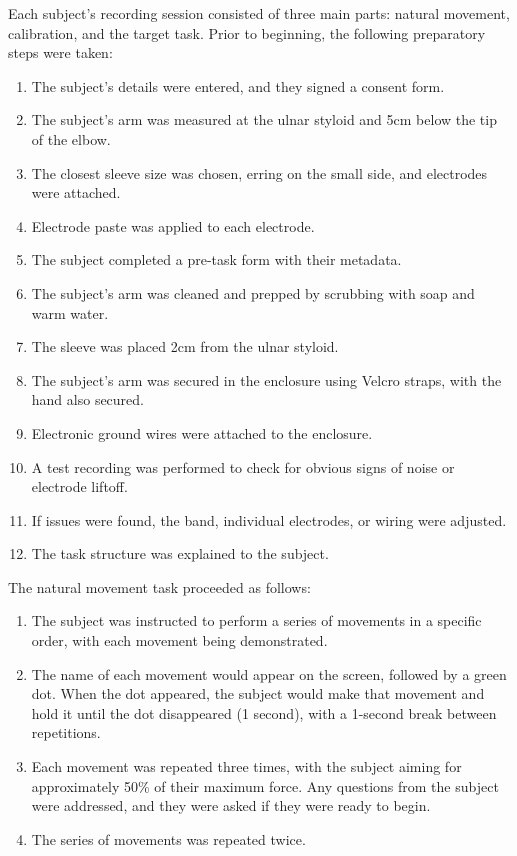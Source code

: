 \documentclass[../main.tex]{subfiles}
\begin{document}
Each subject's recording session consisted of three main parts: natural movement, calibration, and the target task. Prior to beginning, the following preparatory steps were taken:
%
\begin{enumerate}
  \item The subject's details were entered, and they signed a consent form.
  \item The subject's arm was measured at the ulnar styloid and 5cm below the tip of the elbow.
  \item The closest sleeve size was chosen, erring on the small side, and electrodes were attached.
  \item Electrode paste was applied to each electrode.
  \item The subject completed a pre-task form with their metadata.
  \item The subject's arm was cleaned and prepped by scrubbing with soap and warm water.
  \item The sleeve was placed 2cm from the ulnar styloid.
  \item The subject's arm was secured in the enclosure using Velcro straps, with the hand also secured.
  \item Electronic ground wires were attached to the enclosure.
  \item A test recording was performed to check for obvious signs of noise or electrode liftoff.
  \item If issues were found, the band, individual electrodes, or wiring were adjusted.
  \item The task structure was explained to the subject.
\end{enumerate}
%
The natural movement task proceeded as follows:
%
\begin{enumerate}
  \item The subject was instructed to perform a series of movements in a specific order, with each movement being demonstrated.
  \item The name of each movement would appear on the screen, followed by a green dot. When the dot appeared, the subject would make that movement and hold it until the dot disappeared (1 second), with a 1-second break between repetitions.
  \item Each movement was repeated three times, with the subject aiming for approximately 50\% of their maximum force.
  Any questions from the subject were addressed, and they were asked if they were ready to begin.
  \item The series of movements was repeated twice.
\end{enumerate}
\end{document}
